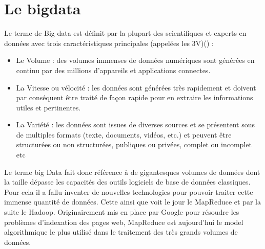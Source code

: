 \section{Le bigdata}
Le terme de Big data est définit par la plupart des scientifiques et experts en données avec trois caractéristiques principales (appelées les 3V)(\cite{kacfah_emani_understandable_2015}) :
\begin{itemize}
    \item Le Volume : des volumes immenses de données numériques sont générées en continu par des millions d’appareils et applications connectes.
    
    \item La Vitesse ou vélocité : les données sont générées très rapidement et doivent par conséquent être traité de façon rapide pour en extraire les informations utiles et pertinentes.
    
    \item La Variété : les données sont issues de diverses sources et se présentent sous de multiples formats (texte, documents, vidéos, etc.) et peuvent être structurées ou non structurées, publiques ou privées, complet ou incomplet etc 
\end{itemize}
\cite{oussous_big_2018}
Le terme big Data fait donc référence à de gigantesques volumes de données dont la taille dépasse les capacités des outils logiciels de base de données classiques. Pour cela il a fallu inventer de nouvelles technologies pour pouvoir traiter cette immense quantité de données. Cette ainsi que voit le jour le MapReduce et par la suite le Hadoop. Originairement mis en place par Google pour résoudre les problèmes d’indexation des pages web, MapReduce est aujourd’hui le model algorithmique le plus utilisé dans le traitement des très grands volumes de données.\cite{kacfah_emani_understandable_2015} \cite{gandomi_beyond_2015} 